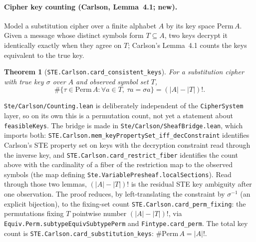 \documentclass[11pt]{article}
\newtheorem{theorem}{Theorem}
\begin{document}
\paragraph{Cipher key counting (Carlson, Lemma~4.1; new).}
Model a substitution cipher over a finite alphabet $A$ by its key space
$\mathrm{Perm}\,A$. Given a message whose distinct symbols form
$T\subseteq A$, two keys decrypt it identically exactly when they agree
on $T$; Carlson's Lemma~4.1 counts the keys equivalent to the true key.
\begin{theorem}[\texttt{STE.Carlson.card\_consistent\_keys}]
For a substitution cipher with true key $\sigma$ over $A$ and observed
symbol set $T$,
\[ \#\{\tau\in\mathrm{Perm}\,A : \forall a\in T,\ \tau a=\sigma a\}
   = (|A|-|T|)!. \]
\end{theorem}
\noindent \texttt{Ste/Carlson/Counting.lean} is deliberately independent
of the \texttt{CipherSystem} layer, so on its own this is a permutation
count, not yet a statement about \texttt{feasibleKeys}. The bridge is
made in \texttt{Ste/Carlson/SheafBridge.lean}, which imports both:
\texttt{STE.Carlson.mem\_keyPropertySet\_iff\_decConstraint} identifies
Carlson's STE property set on keys with the decryption constraint read
through the inverse key, and
\texttt{STE.Carlson.card\_restrict\_fiber} identifies the count above
with the cardinality of a fiber of the restriction map to the observed
symbols (the map defining
\texttt{Ste.VariablePresheaf.localSections}). Read through those two
lemmas, $(|A|-|T|)!$ is the residual STE key ambiguity after one
observation.
\noindent The proof reduces, by left-translating the constraint by
$\sigma^{-1}$ (an explicit bijection), to the fixing-set count
\texttt{STE.Carlson.card\_perm\_fixing}: the permutations fixing $T$
pointwise number $(|A|-|T|)!$, via
\texttt{Equiv.Perm.subtypeEquivSubtypePerm} and
\texttt{Fintype.card\_perm}. The total key count is
\texttt{STE.Carlson.card\_substitution\_keys}: $\#\mathrm{Perm}\,A=|A|!$.
\end{document}
